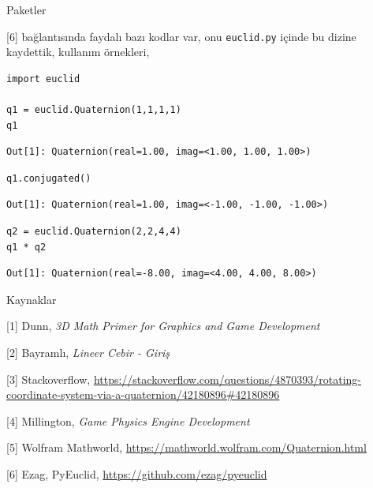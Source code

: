 \documentclass[12pt,fleqn]{article}\usepackage{../../common}
\begin{document}
Paketler

[6] bağlantısında faydalı bazı kodlar var, onu \verb!euclid.py! içinde
bu dizine kaydettik, kullanım örnekleri,

\begin{verbatim}
import euclid

q1 = euclid.Quaternion(1,1,1,1)
q1
\end{verbatim}

\begin{verbatim}
Out[1]: Quaternion(real=1.00, imag=<1.00, 1.00, 1.00>)
\end{verbatim}

\begin{verbatim}
q1.conjugated()
\end{verbatim}

\begin{verbatim}
Out[1]: Quaternion(real=1.00, imag=<-1.00, -1.00, -1.00>)
\end{verbatim}

\begin{verbatim}
q2 = euclid.Quaternion(2,2,4,4)
q1 * q2
\end{verbatim}

\begin{verbatim}
Out[1]: Quaternion(real=-8.00, imag=<4.00, 4.00, 8.00>)
\end{verbatim}

Kaynaklar

[1] Dunn, {\em 3D Math Primer for Graphics and Game Development}

[2] Bayramlı, {\em Lineer Cebir - Giriş}

[3] Stackoverflow,
    \url{https://stackoverflow.com/questions/4870393/rotating-coordinate-system-via-a-quaternion/42180896#42180896}

[4] Millington, {\em Game Physics Engine Development}

[5] Wolfram Mathworld,
    \url{https://mathworld.wolfram.com/Quaternion.html}

[6] Ezag, PyEuclid,
    \url{https://github.com/ezag/pyeuclid}
    
\end{document}
